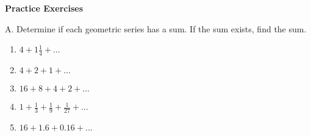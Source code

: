 \textbf{Practice Exercises}

\vspce

A. Determine if each geometric series has a sum. If the sum exists, find the sum.   

\begin{enumerate}[label = \arabic*. ]


	\item \hspce $\displaystyle 4+1\frac{1}{4}+... $
	\item \hspce $4+2+1+...$
		\item \hspce$16+8+4+2+...$  
	\item \hspce $\displaystyle 1+\frac{1}{3}+\frac{1}{9}+\frac{1}{27}+...$

	\item \hspce $16+1.6+0.16+... $
	

\end{enumerate}
